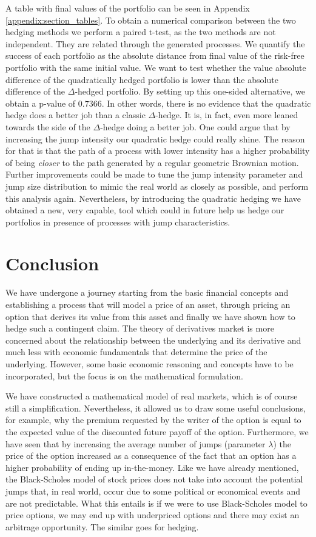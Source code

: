 \documentclass[times, utf8, diplomski]{fer}
\begin{document}
\noindent A table with final values of the portfolio can be seen in Appendix \ref{appendix:section_tables}. To obtain a numerical comparison between the two hedging methods we perform a paired t-test, as the two methods are not independent. They are related through the generated processes. We quantify the success of each portfolio as the absolute distance from final value of the  risk-free portfolio with the same initial value. We want to test whether the value absolute difference of the quadratically hedged portfolio is lower than the absolute difference of the $\Delta$-hedged portfolio. By setting up this one-sided alternative, we obtain a p-value of $0.7366$. In other words, there is no evidence that the quadratic hedge does a better job than a classic $\Delta$-hedge. It is, in fact, even more leaned towards the side of the $\Delta$-hedge doing a better job. One could argue that by increasing the jump intensity our quadratic hedge could really shine. The reason for that is that the path of a process with lower intensity has a higher probability of being \textit{closer} to the path generated by a regular geometric Brownian motion. Further improvements could be made to tune the jump intensity parameter and jump size distribution to mimic the real world as closely as possible, and perform this analysis again. Nevertheless, by introducing the quadratic hedging we have obtained a new, very capable, tool which could in future help us hedge our portfolios in presence of processes with jump characteristics.

\chapter{Conclusion}
We have undergone a journey starting from the basic financial concepts and establishing a process that will model a price of an asset, through pricing an option that derives its value from this asset and finally we have shown how to hedge such a contingent claim. The theory of derivatives market is more concerned about the relationship between the underlying and its derivative and much less with economic fundamentals that determine the price of the underlying. However, some basic economic reasoning and concepts have to be incorporated, but the focus is on the mathematical formulation. 

We have constructed a mathematical model of real markets, which is of course still a simplification. Nevertheless, it allowed us to draw some useful conclusions, for example, why the premium requested by the writer of the option is equal to the expected value of the discounted future payoff of the option. Furthermore, we have seen that by increasing the average number of jumps (parameter $\lambda$) the price of the option increased as a consequence of the fact that an option has a higher probability of ending up in-the-money. Like we have already mentioned, the Black-Scholes model of stock prices does not take into account the potential jumps that, in real world, occur due to some political or economical events and are not predictable. What this entails is if we were to use Black-Scholes model to price options, we may end up with underpriced options and there may exist an arbitrage opportunity. The similar goes for hedging.
\end{document}
